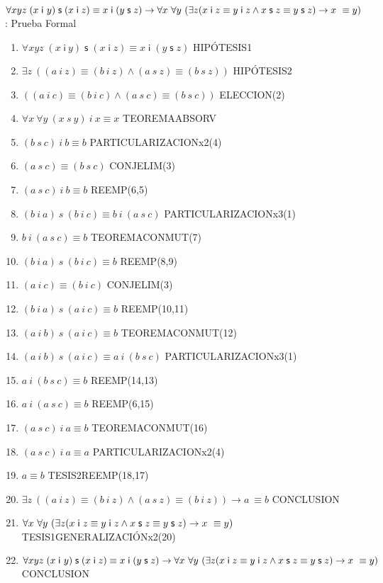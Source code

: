 \documentclass[10pt]{beamer}
\newcommand{\Cfont}{\fontsize{5.5}{7.2}\selectfont}
\newcommand{\Cfonti}{\fontsize{8.5}{7.2}\selectfont}
\newcommand{\Nand}{\wedge}
\newcommand{\idistr}{\forall xyz\;(x\;\mathsf{i}\
y)\;\mathsf{s}\;(x\;\mathsf{i}\;z)\equiv x\;\mathsf{i}\;(y\;\mathsf{s}%
\;z)}
\newcommand{\myconj}{x\;\mathsf{i}\;z\equiv y\;\mathsf{%
i}\;z\wedge x\;\mathsf{s}\;z\equiv y\;\mathsf{s}\;z}
\begin{document}
\begin{frame}{\Cfonti$\idistr \rightarrow \forall x\ \forall y\ (\exists z (\myconj) \rightarrow x\ \equiv y)$:
    Prueba Formal
}
\Cfont
  \begin{enumerate}[<+->]
    \item $ \idistr $ \hfill HIPÓTESIS1
    \item $ \exists z\ ((a\ i\ z) \equiv (b\ i\ z) \Nand (a\ s\ z) \equiv (b\ s\ z))$ \hfill HIPÓTESIS2
    \item $ ((a\ i\ c) \equiv (b\ i\ c) \Nand (a\ s\ c) \equiv (b\ s\ c))$ \hfill ELECCION(2)
    \item $ \forall x\ \forall y\ (x\ s\ y)\ i\ x \equiv x$ \hfill TEOREMAABSORV
    \item $ (b\ s\ c)\ i\ b \equiv b$ \hfill PARTICULARIZACIONx2(4)
    \item $ (a\ s\ c) \equiv (b\ s\ c) $ \hfill CONJELIM(3)

    \item $ (a\ s\ c)\ i\ b \equiv b$ \hfill REEMP(6,5)
    \item $ (b\ i\ a)\ s\ (b\ i\ c) \equiv b\ i\ (a\ s\ c) $ \hfill PARTICULARIZACIONx3(1)
    \item $ b\ i\ (a\ s\ c) \equiv b$ \hfill TEOREMACONMUT(7)
    \item $ (b\ i\ a)\ s\ (b\ i\ c) \equiv b$ \hfill REEMP(8,9)
    \item $ (a\ i\ c) \equiv (b\ i\ c) $ \hfill CONJELIM(3)

    \item $ (b\ i\ a)\ s\ (a\ i\ c) \equiv b$ \hfill REEMP(10,11)
    \item $ (a\ i\ b)\ s\ (a\ i\ c) \equiv b$ \hfill TEOREMACONMUT(12)
    \item $ (a\ i\ b)\ s\ (a\ i\ c) \equiv a\ i\ (b\ s\ c)$ \hfill PARTICULARIZACIONx3(1)
    \item $ a\ i\ (b\ s\ c) \equiv b $ \hfill REEMP(14,13)
    \item $ a\ i\ (a\ s\ c) \equiv b $ \hfill REEMP(6,15)
    \item $ (a\ s\ c)\ i\ a \equiv b$ \hfill TEOREMACONMUT(16)
    \item $ (a\ s\ c)\ i\ a \equiv a$ \hfill PARTICULARIZACIONx2(4)
    \item $ a \equiv b$ \hfill TESIS2REEMP(18,17)
    \item $ \exists z\ ((a\ i\ z) \equiv (b\ i\ z) \Nand (a\ s\ z) \equiv (b\ i\ z)) \rightarrow a\ \equiv b$ \hfill CONCLUSION
    \item $ \forall x\ \forall y\ (\exists z (\myconj) \rightarrow x\ \equiv y)$ \hfill TESIS1GENERALIZACIÓNx2(20)
    \item $ \idistr \rightarrow \forall x\ \forall y\ (\exists z (\myconj) \rightarrow x\ \equiv y)$ \hfill CONCLUSION

  \end{enumerate}
  \setcounter{equation}{0}

\end{frame}
\end{document}
